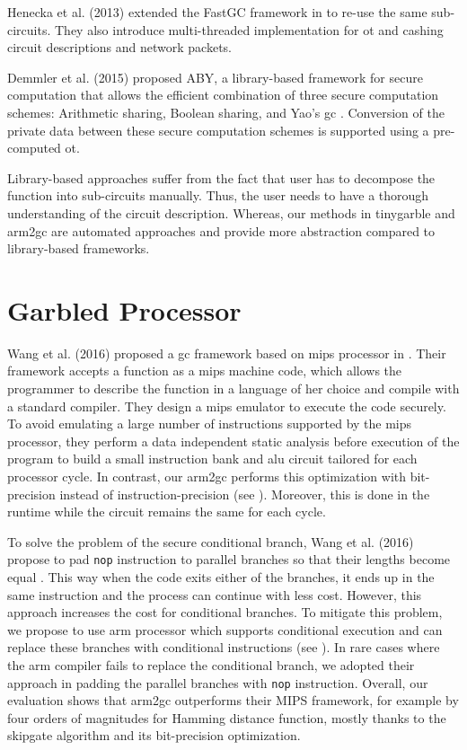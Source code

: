 Henecka et al. (2013) extended the FastGC framework in \cite{henecka2013faster} to re-use the same sub-circuits.
They also introduce multi-threaded implementation for \acrfull{ot} and cashing circuit descriptions and network packets.

Demmler et al. (2015) proposed ABY, a library-based framework for secure computation that allows the efficient combination of three secure computation schemes: Arithmetic sharing, Boolean sharing, and Yao’s \acrshort{gc} \cite{demmler2015aby}.
Conversion of the private data between these secure computation schemes is supported using a pre-computed \acrshort{ot}.

Library-based approaches suffer from the fact that user has to decompose the function into sub-circuits manually.
Thus, the user needs to have a thorough understanding of the circuit description.
Whereas, our methods in \gls{tinygarble} and \gls{arm2gc} are automated approaches and provide more abstraction compared to library-based frameworks.

\section{Garbled Processor}\label{sec:related-processor}
Wang et al. (2016) proposed a \acrshort{gc} framework based on \gls{mips} processor in \cite{wang2016secure}.
Their framework accepts a function as a \gls{mips} machine code, which allows the programmer to describe the function in a language of her choice and compile with a standard compiler.
They design a \gls{mips} emulator to execute the code securely.
To avoid emulating a large number of instructions supported by the \gls{mips} processor, they perform a data independent static analysis before execution of the program to build a small instruction bank and \acrfull{alu} circuit tailored for each processor cycle.
In contrast, our \gls{arm2gc} performs this optimization with bit-precision instead of instruction-precision (see ).
Moreover, this is done in the runtime while the circuit remains the same for each cycle.

To solve the problem of the secure conditional branch, Wang et al. (2016) propose to pad \texttt{nop} instruction to parallel branches so that their lengths become equal \cite{wang2016secure}.
This way when the code exits either of the branches, it ends up in the same instruction and the process can continue with less cost.
However, this approach increases the cost for conditional branches.
To mitigate this problem, we propose to use \gls{arm} processor which supports conditional execution and can replace these branches with conditional instructions (see ).
In rare cases where the \gls{arm} compiler fails to replace the conditional branch, we adopted their approach in padding the parallel branches with \texttt{nop} instruction.
Overall, our evaluation shows that \gls{arm2gc} outperforms their MIPS framework, for example by four orders of magnitudes for Hamming distance function, mostly thanks to the \gls{skipgate} algorithm and its bit-precision optimization.

